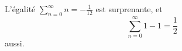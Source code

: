 L'égalité $\sum_{n=0}^{\infty} n = -\frac{1}{12}$ est
surprenante, et \[\sum_{n=0}^{\infty} 1-1 = \frac{1}{2}\] aussi.
